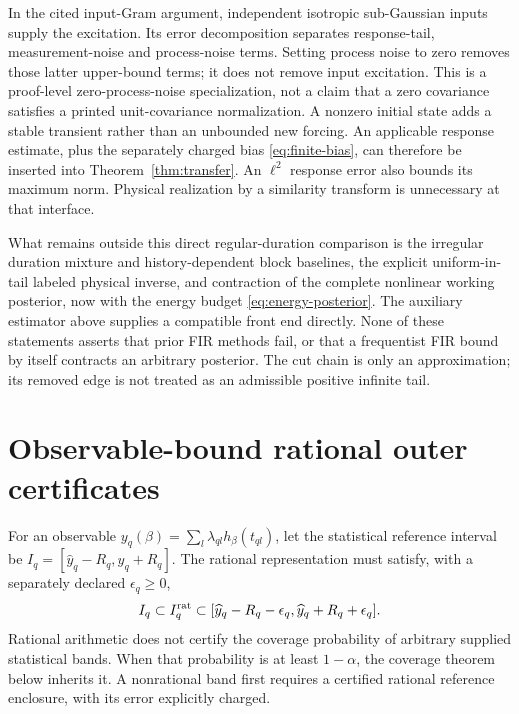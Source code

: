 \documentclass[11pt,reqno]{amsart}
\theoremstyle{remark}\newtheorem{remark}[theorem]{Remark}
\begin{document}
In the cited input-Gram argument, independent isotropic sub-Gaussian inputs
supply the excitation. Its error decomposition separates response-tail,
measurement-noise and process-noise terms. Setting process noise to zero
removes those latter upper-bound terms; it does not remove input excitation.
This is a proof-level zero-process-noise specialization, not a claim that a
zero covariance satisfies a printed unit-covariance normalization. A nonzero
initial state adds a stable transient rather than an unbounded new forcing.
An applicable response estimate, plus the separately charged bias
\eqref{eq:finite-bias}, can therefore be inserted into
Theorem~\ref{thm:transfer}. An $\ell^2$ response error also bounds its maximum
norm. Physical realization by a similarity transform is unnecessary at that
interface.

What remains outside this direct regular-duration comparison is the irregular
duration mixture and history-dependent block baselines, the explicit
uniform-in-tail labeled physical inverse, and contraction of the complete
nonlinear working posterior, now with the energy budget
\eqref{eq:energy-posterior}. The auxiliary estimator above supplies a compatible
front end directly. None of these statements asserts that prior FIR methods
fail, or that a frequentist FIR bound by itself contracts an arbitrary posterior.
The cut chain is only an approximation; its removed edge is not treated as an
admissible positive infinite tail.

\section{Observable-bound rational outer certificates}
\label{sec:enclosures}
For an observable $y_q(\beta)=\sum_l\lambda_{ql}h_\beta(t_{ql})$, let the
statistical reference interval be $I_q=[\widehat y_q-R_q,\widehat y_q+R_q]$.
The rational representation must satisfy, with a separately declared
$\epsilon_q\ge0$,
\begin{equation}
 I_q\subset I_q^{\rm rat}\subset
 [\widehat y_q-R_q-\epsilon_q,\widehat y_q+R_q+\epsilon_q].
 \label{eq:representation}
\end{equation}
Rational arithmetic does not certify the coverage probability of arbitrary
supplied statistical bands. When that probability is at least $1-\alpha$,
the coverage theorem below inherits it. A nonrational band first requires a
certified rational reference enclosure, with its error explicitly charged.
\end{document}
